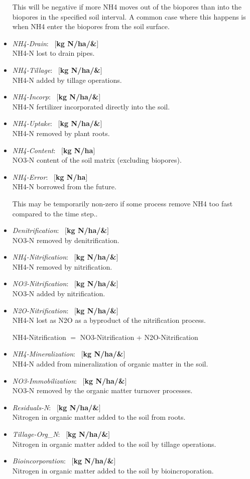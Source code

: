 \documentclass[a4paper]{article}
\begin{document}
\begin{itemize}
This will be negative if more NH4 moves out of the biopores than
into the biopores in the specified soil interval.  A common case
where this happens is when NH4 enter the biopores from the soil
surface.
\item \textit{NH4-Drain}: ~$[$\textbf{kg N/ha/\&}$]$\\
NH4-N lost to drain pipes.
\item \textit{NH4-Tillage}: ~$[$\textbf{kg N/ha/\&}$]$\\
NH4-N added by tillage operations.
\item \textit{NH4-Incorp}: ~$[$\textbf{kg N/ha/\&}$]$\\
NH4-N fertilizer incorporated directly into the soil.
\item \textit{NH4-Uptake}: ~$[$\textbf{kg N/ha/\&}$]$\\
NH4-N removed by plant roots.
\item \textit{NH4-Content}: ~$[$\textbf{kg N/ha}$]$\\
NO3-N content of the soil matrix (excluding biopores).
\item \textit{NH4-Error}: ~$[$\textbf{kg N/ha}$]$\\
NH4-N borrowed from the future.  

This may be temporarily non-zero if some process remove NH4 too
fast compared to the time step..
\item \textit{Denitrification}: ~$[$\textbf{kg N/ha/\&}$]$\\
NO3-N removed by denitrification.
\item \textit{NH4-Nitrification}: ~$[$\textbf{kg N/ha/\&}$]$\\
NH4-N removed by nitrification.
\item \textit{NO3-Nitrification}: ~$[$\textbf{kg N/ha/\&}$]$\\
NO3-N added by nitrification.
\item \textit{N2O-Nitrification}: ~$[$\textbf{kg N/ha/\&}$]$\\
NH4-N lost as N2O as a byproduct of the nitrification process.

NH4-Nitrification $=$ NO3-Nitrification + N2O-Nitrification
\item \textit{NH4-Mineralization}: ~$[$\textbf{kg N/ha/\&}$]$\\
NH4-N added from mineralization of organic matter in the soil.
\item \textit{NO3-Immobilization}: ~$[$\textbf{kg N/ha/\&}$]$\\
NO3-N removed by the organic matter turnover processes.
\item \textit{Residuals-N}: ~$[$\textbf{kg N/ha/\&}$]$\\
Nitrogen in organic matter added to the soil from roots.
\item \textit{Tillage-Org\_N}: ~$[$\textbf{kg N/ha/\&}$]$\\
Nitrogen in organic matter added to the soil by tillage operations.
\item \textit{Bioincorporation}: ~$[$\textbf{kg N/ha/\&}$]$\\
Nitrogen in organic matter added to the soil by bioincroporation.


\end{itemize}
\end{document}
